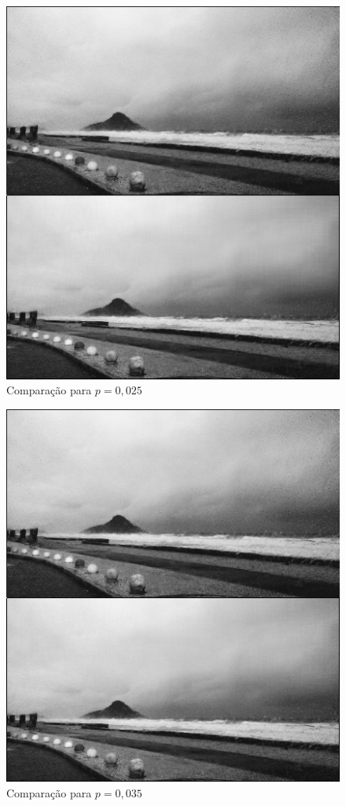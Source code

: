 \documentclass[11pt]{article}
\begin{document}
\begin{enumerate}
            \begin{figure}[H]
                \centering
                \includegraphics[]{2-2-025}
                \caption{Comparação para $p = 0,025$}
            \end{figure}
            
            \begin{figure}[H]
                \centering
                \includegraphics[]{2-2-035}
                \caption{Comparação para $p = 0,035$}
            \end{figure}
            

\end{enumerate}
\end{document}
